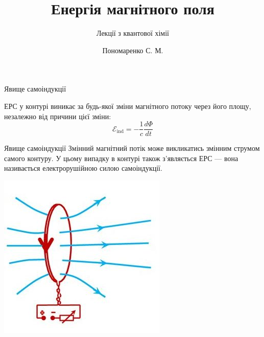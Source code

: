 \documentclass{beamer}
\title[Лекції електрики та магнетизму]{\huge\bfseries Енергія магнітного поля}
\subtitle{Лекції з квантової хімії}
\author{Пономаренко С. М.}
\begin{document}
\begin{frame}[plain]
	\maketitle
\end{frame}


\begin{frame}{Явище самоіндукції}

	ЕРС у контурі виникає за будь-якої зміни магнітного потоку через його площу, незалежно від причини цієї зміни:
	\begin{equation*}
		\mathcal{E}_\text{ind} = -\frac1c \frac{d\Phi}{dt}
	\end{equation*}


		\begin{block}{Явище самоіндукції}
			Змінний магнітний потік може викликатись змінним струмом самого контуру. У цьому випадку в контурі також з'являється ЕРС --- вона називається електрорушійною силою самоіндукції.
		\end{block}

		\begin{center}
			\includegraphics[width=0.35\linewidth]{selfinduction}
		\end{center}

\end{frame}
\end{document}
